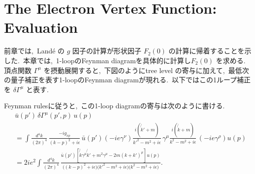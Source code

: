 \documentclass[uplatex,dvipdfmx,a4paper,11pt]{jsarticle}
\begin{document}
\section{The Electron Vertex Function: Evaluation}
前章では,~Landé の \(g\) 因子の計算が形状因子 \(F_2(0)\) の計算に帰着することを示した.~本章では,~1-loopのFeynman diagramを具体的に計算し\(F_2(0)\) を求める.
頂点関数 \(\Gamma^\mu\) を摂動展開すると,~下図のようにtree level の寄与に加えて,~最低次の量子補正を表す1-loopのFeynman diagramが現れる.~以下ではこの1ループ補正を \(\delta\Gamma^\mu\) と表す.

Feynman rulesに従うと,~この1-loop diagramの寄与は次のように書ける.
\begin{equation}
\begin{aligned}
&\bar u(p')\,\delta\Gamma^\mu(p',p)\,u(p)
\\[2pt]
&=\int\frac{d^4k}{(2\pi)^4}\,
\frac{-ig_{\nu\rho}}{(k-p)^2+i\epsilon}\,
\bar u(p')(-ie\gamma^\nu)
\frac{i(\not{k}'+m)}{k'^2-m^2+i\epsilon}\,
\gamma^\mu
\frac{i(\not{k}+m)}{k^2-m^2+i\epsilon}\,
(-ie\gamma^\rho)u(p)
\\[2pt]
&=2ie^2\int\frac{d^4k}{(2\pi)^4}\,
\frac{
\bar u(p')
\left[
\not{k}\gamma^\mu\not{k}'
+m^2\gamma^\mu
-2m(k+k')^\mu
\right]u(p)
}{
\bigl((k-p)^2+i\epsilon\bigr)
\bigl(k'^2-m^2+i\epsilon\bigr)
\bigl(k^2-m^2+i\epsilon\bigr)
}.
\end{aligned}
\end{equation}
\end{document}
